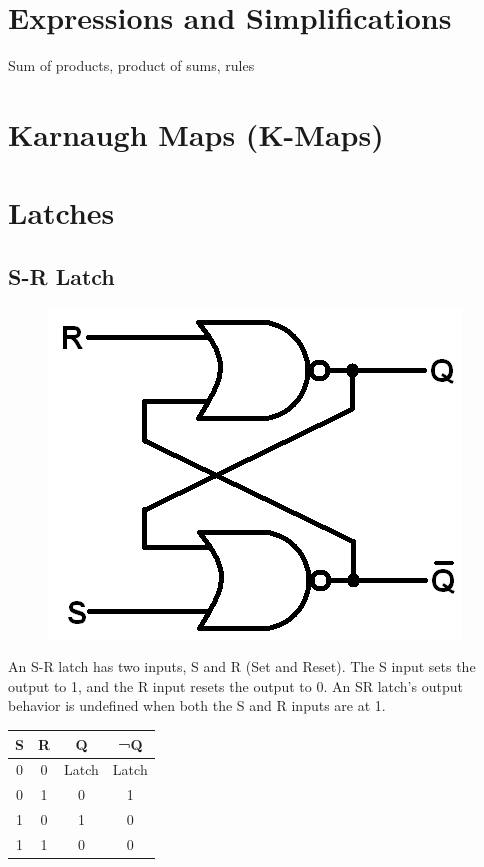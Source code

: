 \section{Expressions and Simplifications}

Sum of products, product of sums, rules

\section{Karnaugh Maps (K-Maps)}

\section{Latches}

\subsection{S-R Latch}

\begin{figure}[h!]
	\includegraphics[scale=0.35]{./img/sr-latch.png}
\end{figure}

An S-R latch has two inputs, S and R (Set and Reset). The S input sets the output to 1, and the R input resets the output to 0. An SR latch's output behavior is undefined when both the S and R inputs are at 1. \\

\begin{tabular}{c c c c}
	\hline
	\textbf{S} & \textbf{R} & \textbf{Q} & \textbf{¬Q} \\ 
	\hline
	0 & 0 & Latch & Latch\\
	0 & 1 & 0 & 1\\
	1 & 0 & 1 & 0 \\
	1 & 1 & 0 & 0 \\
	\hline 
\end{tabular} \\

